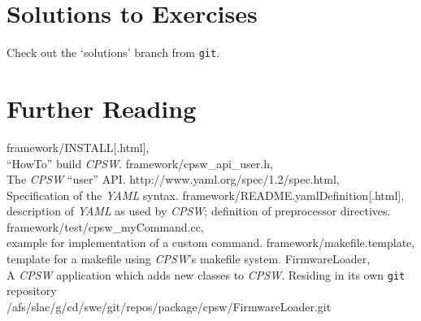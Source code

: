 \documentclass[10pt]{article}
\newcommand{\ita}[1]{\emph{#1}}
\newcommand{\cpsw}      {\ita {CPSW}}
\newcommand{\yaml}      {\ita {YAML}}
\newcommand{\git}       {{\tt{}git}}
\newcommand{\cod}[1] {{\tt#1}}
\begin{document}
\section{Solutions to Exercises}
Check out the `solutions' branch from \git{}.

\section{Further Reading}

\begin{thebibliography}{9}
framework/INSTALL[.html],\\
``HowTo'' build \cpsw{}.
framework/cpsw\_api\_user.h,\\
The \cpsw{} ``user'' API.
http://www.yaml.org/spec/1.2/spec.html,\\
Specification of the \yaml{} syntax.
framework/README.yamlDefinition[.html],\\
description of \yaml{} as used by \cpsw{}; definition of preprocessor directives.
framework/test/cpsw\_myCommand.cc,\\
example for implementation of a custom command.
framework/makefile.template,\\
template for a makefile using \cpsw{}'s makefile system.
FirmwareLoader,\\
A \cpsw{} application which adds new classes to \cpsw{}. Residing in its own
\cod{git} repository\\
/afs/slac/g/cd/swe/git/repos/package/cpsw/FirmwareLoader.git
\end{thebibliography}
\end{document}
